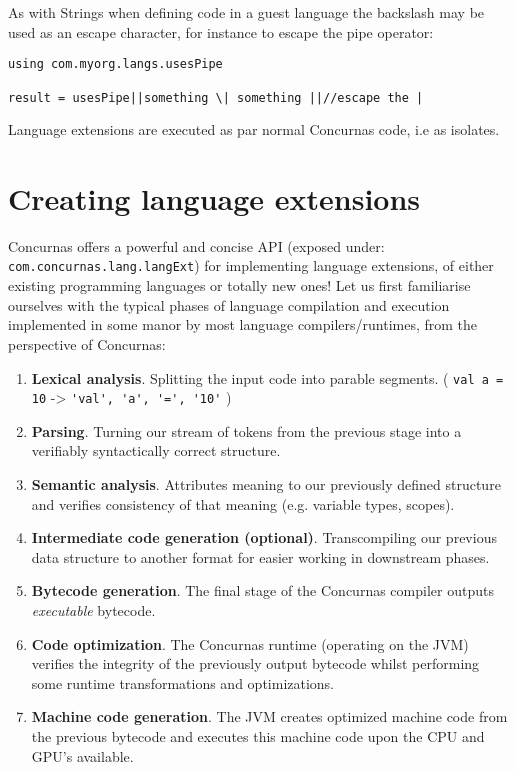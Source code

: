 \documentclass[conc-doc]{subfiles}
\begin{document}
As with Strings when defining code in a guest language the backslash may be used as an escape character, for instance to escape the pipe operator:

\begin{lstlisting}
using com.myorg.langs.usesPipe

result = usesPipe||something \| something ||//escape the |
\end{lstlisting}

Language extensions are executed as par normal Concurnas code, i.e as isolates. 





\section{Creating language extensions}
Concurnas offers a powerful and concise API (exposed under: \lstinline{com.concurnas.lang.langExt}) for implementing language extensions, of either existing programming languages or totally new ones! Let us first familiarise ourselves with the typical phases of language compilation and execution implemented in some manor by most language compilers/runtimes, from the perspective of Concurnas:

\begin{enumerate}
	\item \textbf{Lexical analysis}. Splitting the input code into parable segments. ( \lstinline{val a = 10} -> \lstinline{'val', 'a', '=', '10'} )
	\item \textbf{Parsing}. Turning our stream of tokens from the previous stage into a verifiably syntactically correct structure.
	\item \textbf{Semantic analysis}. Attributes meaning to our previously defined structure and verifies consistency of that meaning (e.g. variable types, scopes).
	\item \textbf{Intermediate code generation (optional)}. Transcompiling our previous data structure to another format for easier working in downstream phases.
	\item \textbf{Bytecode generation}. The final stage of the Concurnas compiler outputs \textit{executable} bytecode.
	\item \textbf{Code optimization}. The Concurnas runtime (operating on the JVM) verifies the integrity of the previously output bytecode whilst performing some runtime transformations and optimizations.
	\item \textbf{Machine code generation}. The JVM creates optimized machine code from the previous bytecode and executes this machine code upon the CPU and GPU's available.
\end{enumerate}
\end{document}
